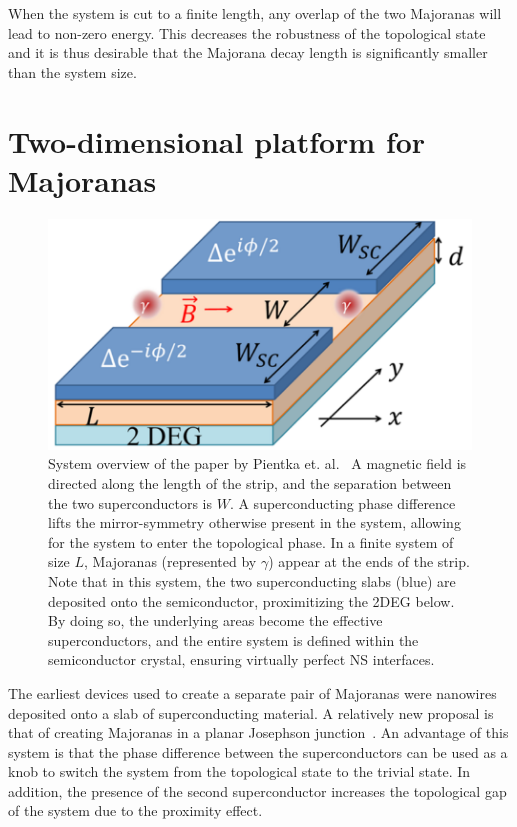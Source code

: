         When the system is cut to a finite length, any overlap of the two Majoranas will lead to non-zero energy.
        This decreases the robustness of the topological state and it is thus desirable that the Majorana decay length is significantly smaller than the system size.

\section{ Two-dimensional platform for Majoranas}

    \begin{figure}[!htb]
    \centering
    \includegraphics[width=0.5\columnwidth]{figures/pientka_system}
    \caption{System overview of the paper by Pientka et. al.~\cite{pientka_topological_2017}
    A magnetic field is directed along the length of the strip, and the separation between the two superconductors is $W$.
    A superconducting phase difference lifts the mirror-symmetry otherwise present in the system, allowing for the system to enter the topological phase.
    In a finite system of size $L$, Majoranas (represented by $\gamma$) appear at the ends of the strip.
    Note that in this system, the two superconducting slabs (blue) are deposited onto the semiconductor, proximitizing the 2DEG below.
    By doing so, the underlying areas become the effective superconductors, and the entire system is defined within the semiconductor crystal, ensuring virtually perfect NS interfaces.}
    \label{fig:pientka_system}
    \end{figure}

    The earliest devices used to create a separate pair of Majoranas were nanowires deposited onto a slab of superconducting material.
    A relatively new proposal is that of creating Majoranas in a planar Josephson junction~\cite{pientka_topological_2017}.
    An advantage of this system is that the phase difference between the superconductors can be used as a knob to switch the system from the topological state to the trivial state. 
    In addition, the presence of the second superconductor increases the topological gap of the system due to the proximity effect.

